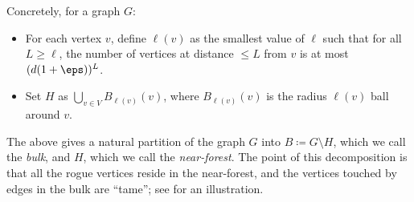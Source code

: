 \documentclass[11pt,letterpaper]{article}
\begin{document}
Concretely, for a graph $G$:
\begin{itemize}
    \item For each vertex $v$, define $\ell(v)$ as the smallest value of $\ell$ such that for all $L\ge \ell$, the number of vertices at distance $\le L$ from $v$ is at most $(d(1+\eps))^L$.
    \item Set $H$ as $\bigcup_{v\in V} B_{\ell(v)}(v)$, where $B_{\ell(v)}(v)$ is the radius $\ell(v)$ ball around $v$.
\end{itemize}
The above gives a natural partition of the graph $G$ into $B \coloneqq G\setminus H$, which we call the \emph{bulk}, and $H$, which we call the \emph{near-forest}.
The point of this decomposition is that all the rogue vertices reside in the near-forest, and the vertices touched by edges in the bulk are ``tame''; see  for an illustration.
\end{document}
